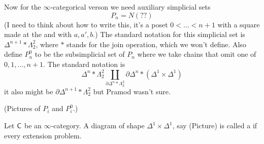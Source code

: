 Now for the $\infty$-categorical verson we need auxiliary simplicial sets
\[
P_n = N(??)
\] 
(I need to think about how to write this, it's a poset $0< \dots< n+1$ with a square made at the and with $a,a',b$.) The standard notation for this simplicial set is $\Delta^{n+1}*\Lambda_2^2$, where $*$ stands for the join operation, which we won't define. Also define $P_n^{0}$ to be the subsimplicial set of $P_n$ where we take chains that omit one of $0,1,\dots,n+1$. The standard notation is
\[
\Delta^{n} * \Lambda^2_2 \coprod_{\partial\Delta^{n}*\Lambda_2^2}\partial\Delta^{n} * (\Delta^{1}\times \Delta^{1})
\] 
it also might be $\partial \Delta^{n+1}*\Lambda_2^2$ but Pramod wasn't sure.

(Pictures of $P_i$ and $P_i^{0}$.)

\begin{definition}
	Let $\mathsf{C}$ be an $\infty$-category. A diagram of shape $\Delta^{1}\times \Delta^{1}$, say (Picture) is called a  if every extension problem.
\end{definition}


